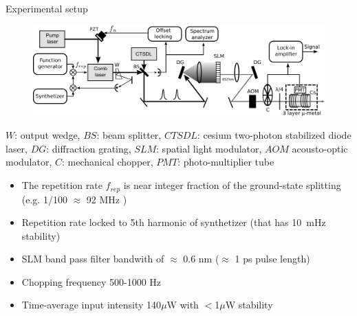 \begin{block}{Experimental setup}
  \begin{figure}
    \begin{center}
      \includegraphics[width=.9\linewidth]{figures/experiment_big}
    \end{center}
    \label{Schematic of the experimental setup}
  \end{figure}
  $W$: output wedge, $BS$: beam splitter, $CTSDL$: cesium two-photon stabilized diode laser, $DG$: diffraction grating, $SLM$: spatial light modulator, $AOM$ acousto-optic modulator, $C$: mechanical chopper, $PMT$: photo-multiplier tube
  \begin{itemize}
  \item The repetition rate $f_{rep}$ is near integer fraction of the ground-state splitting (e.g. 1/100 $\approx$ 92 MHz )
  \item Repetition rate locked to 5th harmonic of synthetizer (that has 10~mHz stability)
  \item SLM band pass filter bandwith of $\approx$ 0.6 nm ($\approx$ 1 ps pulse length)
  \item Chopping frequency 500-1000 Hz
  \item Time-average input intensity 140$\mu$W with $<$1$\mu$W stability 
  \end{itemize}
\end{block}
